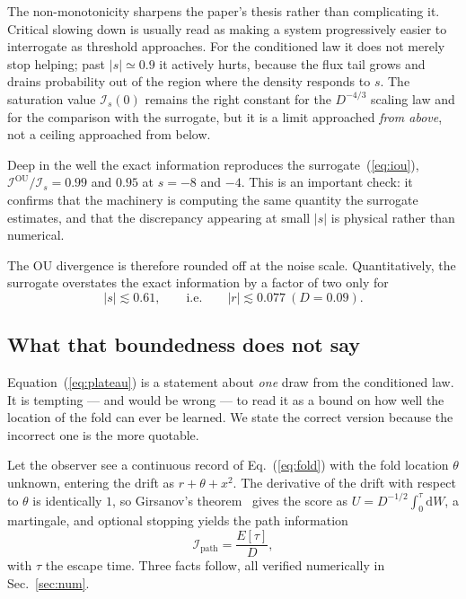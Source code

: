 \documentclass[%
 aip,
 cha,
 amsmath,amssymb,
 reprint,
 superscriptaddress,
 floatfix,
]{revtex4-2}
\newcommand{\dd}{\mathrm{d}}
\newcommand{\Ifish}{\mathcal{I}}
\begin{document}
The non-monotonicity sharpens the paper's thesis rather than complicating it.  Critical slowing down is usually read as making a system progressively easier to interrogate as threshold approaches.  For the conditioned law it does not merely stop helping; past $|s|\simeq0.9$ it actively hurts, because the flux tail grows and drains probability out of the region where the density responds to $s$.  The saturation value $\Ifish_s(0)$ remains the right constant for the $D^{-4/3}$ scaling law and for the comparison with the surrogate, but it is a limit approached \emph{from above}, not a ceiling approached from below.

Deep in the well the exact information reproduces the surrogate~(\ref{eq:iou}), $\Ifish^{\mathrm{OU}}/\Ifish_s=0.99$ and $0.95$ at $s=-8$ and $-4$.  This is an important check: it confirms that the machinery is computing the same quantity the surrogate estimates, and that the discrepancy appearing at small $|s|$ is physical rather than numerical.

The OU divergence is therefore rounded off at the noise scale.  Quantitatively, the surrogate overstates the exact information by a factor of two only for
\begin{equation}
\label{eq:s2x}
|s|\lesssim0.61,\qquad\text{i.e.}\qquad |r|\lesssim0.077\ (D=0.09).
\end{equation}

\subsection{\label{sec:pathinfo}What that boundedness does not say}

Equation~(\ref{eq:plateau}) is a statement about \emph{one} draw from the conditioned law.  It is tempting --- and would be wrong --- to read it as a bound on how well the location of the fold can ever be learned.  We state the correct version because the incorrect one is the more quotable.

Let the observer see a continuous record of Eq.~(\ref{eq:fold}) with the fold location $\theta$ unknown, entering the drift as $r+\theta+x^2$.  The derivative of the drift with respect to $\theta$ is identically $1$, so Girsanov's theorem~\cite{LiptserShiryaev2001} gives the score as $U=D^{-1/2}\!\int_0^{\tau}\dd W$, a martingale, and optional stopping yields the path information
\begin{equation}
\label{eq:ipath}
\Ifish_{\mathrm{path}}=\frac{E[\tau]}{D},
\end{equation}
with $\tau$ the escape time.  Three facts follow, all verified numerically in Sec.~\ref{sec:num}.
\end{document}
